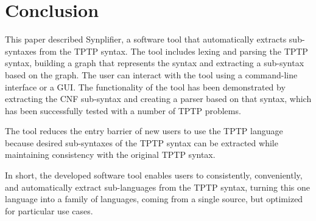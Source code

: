 
\chapter{Conclusion}\label{cha:Conclusion}

This paper described \ac{Synplifier}, a software tool that automatically extracts sub-syntaxes from the \ac{TPTP} syntax. 
The tool includes lexing and parsing the \ac{TPTP} syntax, building 
a graph that represents the syntax and extracting a sub-syntax based on the graph. The user can interact with the tool using a command-line interface or a GUI.
The functionality of the tool has been demonstrated by extracting the \ac{CNF} sub-syntax and creating a parser based on that syntax, which has been successfully tested with a number of \ac{TPTP} problems.

The tool reduces the entry barrier of new users to use the \ac{TPTP} language because desired sub-syntaxes of the \ac{TPTP} syntax can be extracted while maintaining consistency with the original \ac{TPTP} syntax.

In short, the developed software tool enables users to consistently, conveniently, and automatically extract sub-languages from the \ac{TPTP} syntax, turning this one language into a family of languages, coming from a single source, but optimized for particular use cases.

